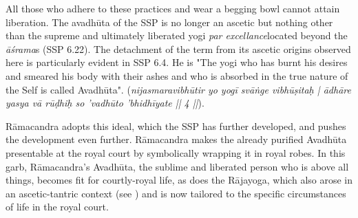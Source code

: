 All those who adhere to these practices and wear a begging bowl cannot attain liberation. The avadhūta of the SSP is no longer an ascetic but nothing other than the supreme and ultimately liberated yogi \textit{par excellance}located beyond the \textit{āśrama}s (SSP 6.22). The detachment of the term from its ascetic origins observed here is particularly evident in SSP 6.4. He is "The yogi who has burnt his desires and smeared his body with their ashes and who is absorbed in the true nature of the Self is called Avadhūta". (\textit{nijasmaravibhūtir yo yogī svāṅge vibhūṣitaḥ | ādhāre yasya vā rūḍhiḥ so 'vadhūto 'bhidhīyate || 4 ||}). 
 
Rāmacandra adopts this ideal, which the SSP has further developed, and pushes the development even further. Rāmacandra makes the already purified Avadhūta presentable at the royal court by symbolically wrapping it in royal robes. In this garb, Rāmacandra's Avadhūta, the sublime and liberated person who is above all things, becomes fit for courtly-royal life, as does the Rājayoga, which also arose in an ascetic-tantric context (see \citeauthor[2019]{birch2019saiva}) and is now tailored to the specific circumstances of life in the royal court. 


